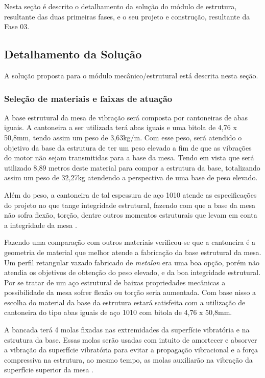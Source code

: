 \label{desenvolvimento_estrutura}
Nesta seção é descrito o detalhamento da solução do módulo de estrutura, resultante das duas primeiras fases, 
e o seu projeto e construção, resultante da Fase 03.

\subsection{Detalhamento da Solução}
A solução proposta para o módulo mecânico/estrutural está descrita nesta seção.

\subsubsection*{\textbf{Seleção de materiais e faixas de atuação}}


A base estrutural da mesa de vibração será composta por cantoneiras de abas iguais. A cantoneira a ser utilizada terá abas iguais e uma bitola de 
4,76 x 50,8mm, tendo assim um peso de 3,63kg/m. Com esse peso, será atendido o objetivo da base da estrutura de ter um peso elevado a fim de 
que as vibrações do motor não sejam transmitidas para a base da mesa. Tendo em vista que será utilizado 8,89 metros deste material para compor 
a estrutura da base, totalizando assim um peso de 32,27kg atendendo a perspectiva de uma base de peso elevado.

Além do peso, a cantoneira de tal espessura de aço 1010 atende as especificações do projeto no que tange integridade estrutural, fazendo com que 
a base da mesa não sofra flexão, torção, dentre outros momentos estruturais que levam em conta a integridade da mesa \cite{acos_continente}.

Fazendo uma comparação com outros materiais verificou-se que a cantoneira é a geometria de material que melhor atende a fabricação da base estrutural 
da mesa. Um perfil retangular vazado fabricado de \textit{metalon} era uma boa opção, porém não atendia os objetivos de obtenção do peso elevado, e da 
boa integridade estrutural. Por se tratar de um aço estrutural de baixas propriedades mecânicas a possibilidade da mesa sofrer flexão ou torção seria 
aumentada. Com base nisso a escolha do material da base da estrutura estará satisfeita com a utilização de cantoneira do tipo abas iguais de aço 1010 
com bitola de 4,76 x 50,8mm.

A bancada terá 4 molas fixadas nas extremidades da superfície vibratória e na estrutura da base. Essas molas serão usadas com intuito de amortecer 
e absorver a vibração da superfície vibratória para evitar a propagação vibracional e a força compressiva na estrutura, ao mesmo tempo, as molas
auxiliarão na vibração da superfície superior da mesa \cite{mola_santos}.

